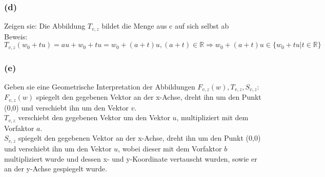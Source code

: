 \documentclass[11pt]{article}
\begin{document}
\subsubsection*{(d)}
Zeigen sie: Die Abbildung $T_{v,z}$ bildet die Menge aus c auf sich selbst ab\\
Beweis: $T_{v,z}(w_0+tu)=au+w_0+tu=w_0+(a+t)u, (a+t)\in \mathbb{R}\Rightarrow w_0+(a+t)u\in \{ w_0+tu|t
\in \mathbb{R} \}$
\subsubsection*{(e)}
Geben sie eine Geometrische Interpretation der Abbildungen $F_{v,z}(w), T_{v,z}, S_{v,z}$:\\
$F_{v,z}(w)$ spiegelt den gegebenen Vektor an der x-Achse, dreht ihn um den Punkt (0,0) und verschiebt ihn um den Vektor $v$.\\
$T_{v,z}$ verschiebt den gegebenen Vektor um den Vektor $u$, multipliziert mit dem Vorfaktor $a$.\\
$S_{v,z}$ spiegelt den gegebenen Vektor an der x-Achse, dreht ihn um den Punkt (0,0) und verschiebt ihn um den Vektor $u$, wobei dieser mit dem Vorfaktor $b$ multipliziert wurde und dessen x- und y-Koordinate vertauscht wurden, sowie er an der y-Achse gespiegelt wurde.
\end{document}
